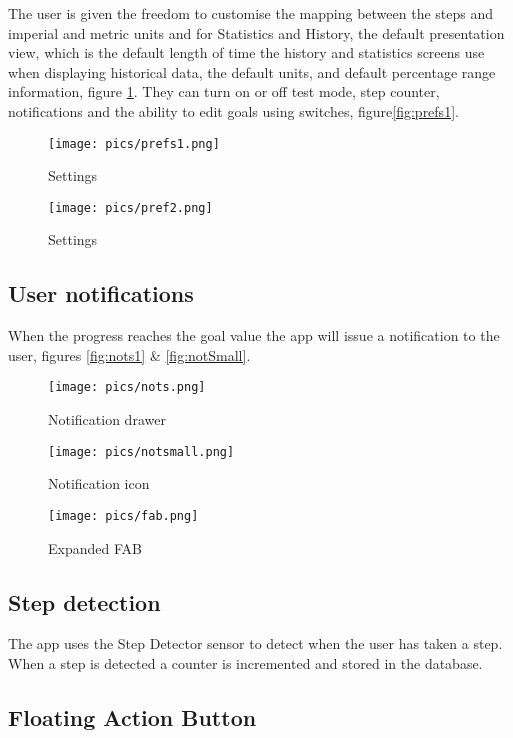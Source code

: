 \documentclass[12pt]{report}
\begin{document}
The user is given the freedom to customise the mapping between the steps and imperial and metric units and for Statistics and History, the default presentation view, which is the default length of time the history and statistics screens use when displaying historical data, the default units, and default percentage range information, figure \ref{fig:prefs2}. They can turn on or off test mode, step counter, notifications and the ability to edit goals using switches, figure\ref{fig:prefs1}. 

\begin{figure}[!htb]
  \texttt{[image: pics/prefs1.png]}
  \caption{Settings}
  \label{fig:prefs1}
\endminipage\hfill
{}
  \texttt{[image: pics/pref2.png]}
  \caption{Settings}\label{fig:prefs2}
\endminipage
\end{figure}

\subsection{User notifications}

When the progress reaches the goal value the app will issue a notification to the user, figures \ref{fig:nots1} \& \ref{fig:notSmall}. 

\begin{figure}[!htb]
  \texttt{[image: pics/nots.png]}
  \caption{Notification drawer}
  \label{fig:nots1}
\endminipage\hfill
{}
  \texttt{[image: pics/notsmall.png]}
  \caption{Notification icon}\label{fig:notSmall}
\endminipage\hfill
{}
  \texttt{[image: pics/fab.png]}
  \caption{Expanded FAB}\label{fig:fabex}
\endminipage
\end{figure}

\subsection{Step detection}

The app uses the Step Detector sensor to detect when the user has taken a step. When a step is detected a counter is incremented and stored in the database. 

\subsection{Floating Action Button}
\end{document}
